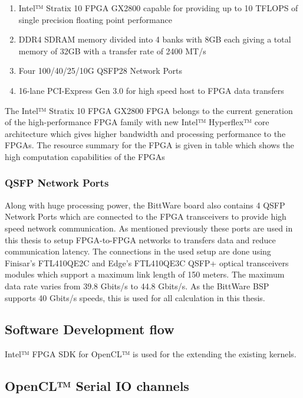 \begin{enumerate}
    \item Intel™ Stratix 10 FPGA GX2800 capable for providing up to 10 TFLOPS of single
    precision floating point performance
    \item DDR4 SDRAM memory divided into 4 banks with 8GB each giving a total memory of 32GB with
    a transfer rate of 2400 MT/s
    \item Four 100/40/25/10G QSFP28 Network Ports
    \item 16-lane PCI-Express Gen 3.0 for high speed host to FPGA data transfers
\end{enumerate}

The Intel™ Stratix 10 FPGA GX2800 FPGA belongs to the current generation of the high-performance FPGA
family with new Intel™ Hyperflex™ core architecture which gives higher bandwidth and processing
performance to the FPGAs. The resource summary for the FPGA is given in table 
which shows the high computation capabilities of the FPGAs

\subsubsection*{QSFP Network Ports}

Along with huge processing power, the BittWare board also contains 4 QSFP Network Ports which
are connected to the FPGA transceivers to provide high speed network communication. As mentioned
previously these ports are used in this thesis to setup FPGA-to-FPGA networks to transfers data
and reduce communication latency. The connections in the used setup are done using
Finisar's FTL410QE2C and Edge's FTL410QE3C QSFP+ optical transceivers modules which support a
maximum link length of 150 meters. The maximum data rate varies from 39.8 Gbits/s to 44.8 Gbits/s.
As the BittWare BSP supports 40 Gbits/s speeds, this is used for all calculation in this thesis.


\subsection{Software Development flow}

Intel™ FPGA SDK for OpenCL™ is used for the extending the existing kernels.

\subsection{OpenCL™ Serial IO channels}


